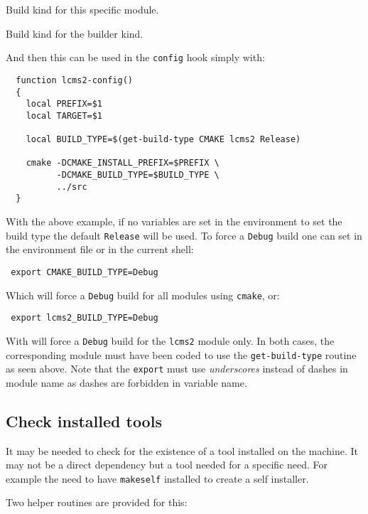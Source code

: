 \documentclass[a4paper,12pt,twoside]{article}
\newcommand{\code}[1]{\texttt{#1}}
\renewcommand{\emph}[1]{\textit{#1}}
\begin{document}
\begin{description}[style=nextline]
	\item [<module>\_BUILD\_TYPE] Build kind for this specific module.
	\item [<CONFIG>\_BUILD\_TYPE] Build kind for the builder kind.
\end{description}

And then this can be used in the \code{config} hook simply with:

\begin{lstlisting}
  function lcms2-config()
  {
    local PREFIX=$1
    local TARGET=$1

    local BUILD_TYPE=$(get-build-type CMAKE lcms2 Release)

    cmake -DCMAKE_INSTALL_PREFIX=$PREFIX \
          -DCMAKE_BUILD_TYPE=$BUILD_TYPE \
          ../src
  }
\end{lstlisting}

With the above example, if no variables are set in the environment to set the build type the default \code{Release} will be used. To force a \code{Debug} build one can set in the environment file or in the current shell:

\begin{lstlisting}
 export CMAKE_BUILD_TYPE=Debug
\end{lstlisting}

Which will force a \code{Debug} build for all modules using \code{cmake}, or:

\begin{lstlisting}
 export lcms2_BUILD_TYPE=Debug
\end{lstlisting}

With will force a \code{Debug} build for the \code{lcms2} module only. In both cases, the corresponding module must have been coded to use the \code{get-build-type} routine as seen above. Note that the \code{export} must use \emph{underscores} instead of dashes in module name as dashes are forbidden in variable name.

\subsection{Check installed tools}

It may be needed to check for the existence of a tool installed on the machine. It may not be a direct dependency but a tool needed for a specific need. For example the need to have \code{makeself} installed to create a self installer.

Two helper routines are provided for this:
\end{document}
